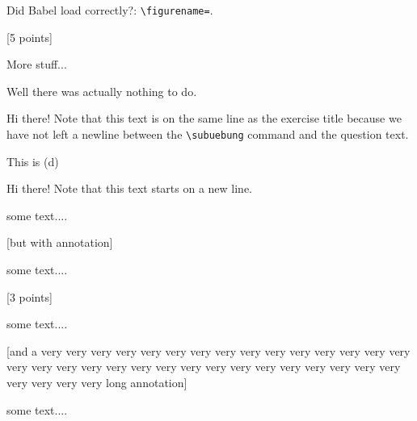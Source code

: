 \documentclass[11pt,a4paper]{article}
\begin{document}
Did Babel load correctly?: \texttt{\textbackslash figurename=}\figurename.



[5 points]

More stuff...

\begin{solution}
  Well there was actually nothing to do.
\end{solution}


Hi there! Note that this text is on the same line as the exercise title because we have
not left a newline between the \texttt{\textbackslash subuebung} command and the question
text.

\begin{exenumerate}\setcounter{exenumeratei}{3}
\item This is (d)
\end{exenumerate}


Hi there! Note that this text starts on a new line.



some text....


[but with annotation]

some text....

[3 points]

some text....

[and a very very very very very very very very very very
very very very very very very very very very very
very very very very very very very very very very
very very very very very long annotation]

some text....
\end{document}
